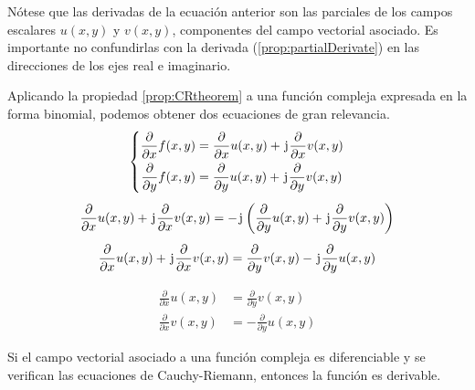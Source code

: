Nótese que las derivadas de la ecuación anterior son las parciales de los campos escalares $u(x,y)$ y $v(x,y)$, componentes del campo vectorial asociado.
Es importante no confundirlas con la derivada (\ref{prop:partialDerivate}) en las direcciones de los ejes real e imaginario.

Aplicando la propiedad \ref{prop:CRtheorem} a una función compleja expresada en la forma binomial, podemos obtener dos ecuaciones de gran relevancia.
\begin{gather*}
    \left\{
    \begin{aligned}
        \frac{\partial}{\partial x} f(x,y) &= \frac{\partial}{\partial x} u(x,y) + \mkern2mu\mathrm{j}\mkern1mu \frac{\partial}{\partial x} v(x,y)
        \\
        \frac{\partial}{\partial y} f(x,y) &= \frac{\partial}{\partial y} u(x,y) + \mkern2mu\mathrm{j}\mkern1mu \frac{\partial}{\partial y} v(x,y)
    \end{aligned}
    \right.
    \\[1ex]
    \frac{\partial}{\partial x} u(x,y) + \mkern2mu\mathrm{j}\mkern1mu \frac{\partial}{\partial x} v(x,y) = - \mkern2mu\mathrm{j}\mkern1mu \left( \frac{\partial}{\partial y} u(x,y) + \mkern2mu\mathrm{j}\mkern1mu \frac{\partial}{\partial y} v(x,y) \right)
    \\[1ex]
    \frac{\partial}{\partial x} u(x,y) + \mkern2mu\mathrm{j}\mkern1mu \frac{\partial}{\partial x} v(x,y) = \frac{\partial}{\partial y} v(x,y) - \mkern2mu\mathrm{j}\mkern1mu \frac{\partial}{\partial y} u(x,y)
\end{gather*}

\begin{mdframed}[style=DefinitionFrame]
    \begin{defn}
        \label{defn:CRequations}
    \end{defn}
    \begin{align*}
        \frac{\partial}{\partial x} u(x,y) &= \frac{\partial}{\partial y} v(x,y)
        \\[1em]
        \frac{\partial}{\partial x} v(x,y) &= - \frac{\partial}{\partial y} u(x,y)
    \end{align*}
\end{mdframed}

\begin{mdframed}[style=PropertyFrame]
    \begin{prop}
    \end{prop}
    Si el campo vectorial asociado a una función compleja es diferenciable y se verifican las ecuaciones de Cauchy-Riemann, entonces la función es derivable.
\end{mdframed}

